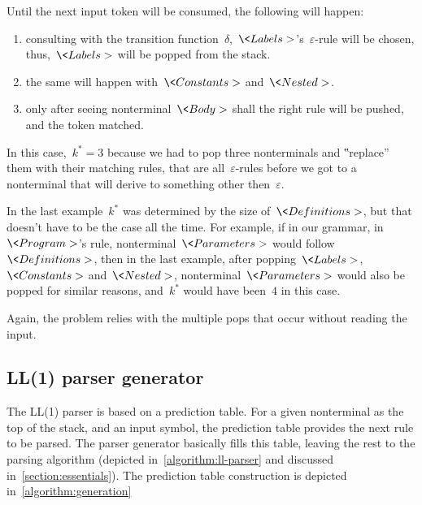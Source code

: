 Until the next input token will be consumed, the following will happen:
  \begin{enumerate}
    \item consulting with the transition
      function~$δ$,~$\<Labels>$'s~$ε$-rule will
      be chosen,
      thus,~$\<Labels>$ will be popped from the stack.
    \item the same will happen with~$\<Constants>$
      and~$\<Nested>$.
    \item only after seeing nonterminal~$\<Body>$ shall the right rule will be
      pushed, and the token matched.
  \end{enumerate}
In this case,~$k^*=3$ because we had to pop three nonterminals and
  ‟replace” them with their matching rules, that are all~$ε$-rules
  before we got to a nonterminal that will derive to something other
  then~$ε$.

In the last example~$k^*$ was determined by the size of~$\<Definitions>$, but that
  doesn't have to be the case all the time.
For example, if in our grammar, in~$\<Program>$'s rule,
  nonterminal~$\<Parameters>$ would follow~$\<Definitions>$,
  then in the last example, after popping~$\<Labels>$,~$\<Constants>$
  and~$\<Nested>$, nonterminal~$\<Parameters>$ would also be popped
  for similar reasons, and~$k^*$ would have been~$4$ in this case.

Again, the problem relies with the multiple pops that occur without reading the input.

\subsection{LL(1) parser generator}
\label{section:generation}
The LL(1) parser is based on a prediction table.
For a given nonterminal as the top of the stack, and an input symbol,
  the prediction table provides the next rule to be parsed.
The parser generator basically fills this table, leaving the
  rest to the parsing algorithm (depicted in~\cref{algorithm:ll-parser}
  and discussed in~\cref{section:essentials}).
  The prediction table construction is depicted in~\cref{algorithm:generation}

